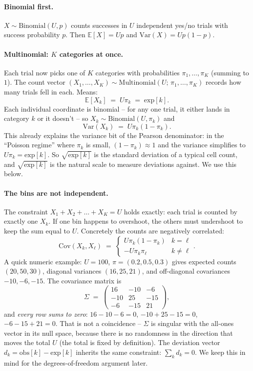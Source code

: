 \documentclass[11pt]{article}
\newcommand{\E}{\mathbb{E}}
\newcommand{\Var}{\mathrm{Var}}
\newcommand{\Cov}{\mathrm{Cov}}
\newcommand{\Bin}{\mathrm{Binomial}}
\newcommand{\Mult}{\mathrm{Multinomial}}
\newcommand{\obs}{\mathrm{obs}}
\newcommand{\expc}{\mathrm{exp}}
\begin{document}
\paragraph{Binomial first.}
$X \sim \Bin(U, p)$ counts successes in $U$ independent yes/no trials with
success probability $p$. Then $\E[X] = Up$ and $\Var(X) = Up(1-p)$.

\paragraph{Multinomial: $K$ categories at once.}
Each trial now picks one of $K$ categories with probabilities
$\pi_1, \dots, \pi_K$ (summing to $1$). The count vector
$(X_1, \dots, X_K) \sim \Mult(U;\, \pi_1, \dots, \pi_K)$ records how many
trials fell in each. Means:
\[
   \E[X_k] \;=\; U\pi_k \;=\; \expc[k].
\]
Each individual coordinate is binomial -- for any one trial, it either lands
in category $k$ or it doesn't -- so $X_k \sim \Bin(U, \pi_k)$ and
\[
   \Var(X_k) \;=\; U\pi_k(1 - \pi_k).
\]
This already explains the variance bit of the Pearson denominator: in the
``Poisson regime'' where $\pi_k$ is small, $(1-\pi_k) \approx 1$ and the
variance simplifies to $U\pi_k = \expc[k]$. So $\sqrt{\expc[k]}$ is the
standard deviation of a typical cell count, and $\sqrt{\expc[k]}$ is the
natural scale to measure deviations against. We use this below.

\paragraph{The bins are not independent.}
The constraint $X_1 + X_2 + \dots + X_K = U$ holds exactly: each trial is
counted by exactly one $X_k$. If one bin happens to overshoot, the others
must undershoot to keep the sum equal to $U$. Concretely the counts are
negatively correlated:
\[
   \Cov(X_k, X_\ell)
   \;=\; \begin{cases}
            U\pi_k(1-\pi_k) & k = \ell \\
            -U\pi_k\pi_\ell & k \neq \ell
         \end{cases}.
\]
A quick numeric example: $U = 100$, $\pi = (0.2, 0.5, 0.3)$ gives expected
counts $(20, 50, 30)$, diagonal variances $(16, 25, 21)$, and off-diagonal
covariances $-10, -6, -15$. The covariance matrix is
\[
   \Sigma \;=\; \begin{pmatrix}
       16 & -10 & -6 \\
      -10 &  25 & -15 \\
       -6 & -15 & 21
   \end{pmatrix},
\]
and \emph{every row sums to zero}: $16 - 10 - 6 = 0$, $-10 + 25 - 15 = 0$,
$-6 - 15 + 21 = 0$. That is not a coincidence -- $\Sigma$ is singular with
the all-ones vector in its null space, because there is no randomness in the
direction that moves the total $U$ (the total is fixed by definition). The
deviation vector $d_k = \obs[k] - \expc[k]$ inherits the same constraint:
$\sum_k d_k = 0$. We keep this in mind for the degrees-of-freedom argument
later.
\end{document}
